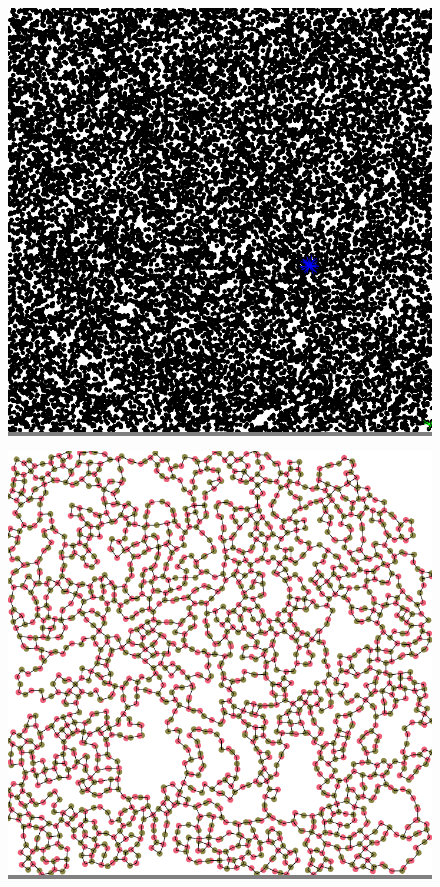 \documentclass{article}
\begin{document}
\begin{figure}
\begin{minipage}{0.3\textwidth}
    \end{minipage}
    \vskip 0.1in
    \begin{minipage}{0.3\textwidth}
    \colorbox{gray}{\includegraphics[width=\linewidth]{./images/square_2.png}}
    \end{minipage}
    \hspace{\fill}
    \begin{minipage}{0.3\textwidth}
    \colorbox{gray}{\includegraphics[width=\linewidth]{./images/square_2_bb_0.png}}

\end{minipage}
\end{figure}
\end{document}
